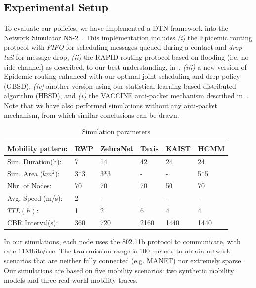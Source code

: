 \subsection{Experimental Setup}
\label{sec:ExperimentalSetup}

To evaluate our policies, we have implemented a DTN framework into the Network Simulator NS-2~\cite{DTN-NS2}. This implementation includes \emph{(i)} the Epidemic routing protocol with \emph{FIFO} for scheduling messages queued during a contact and \emph{drop-tail} for message drop, \emph{(ii)} the RAPID routing protocol based on flooding (i.e. no side-channel) as described, to our best
understanding, in~\cite{Levine:Sigcomm07}, \emph{(iii)} a new version of Epidemic routing enhanced with our optimal joint scheduling and drop policy (GBSD), \emph{(iv)} another version using our statistical learning based distributed algorithm (HBSD), and \emph{(v)} the VACCINE anti-packet mechanism described in~\cite{Towsley:Epidemic}. Note that we have also performed simulations without any anti-packet mechanism, from which similar conclusions can be drawn.

\begin{table}[!h]
\renewcommand{\arraystretch}{1.1}
\caption{Simulation parameters}
\centering
\begin{tabular}{|p{4cm}|p{1.5cm}|p{1.5cm}|p{1.5cm}|p{1.5cm}|p{1.5cm}|}
\hline
\bfseries Mobility pattern: & RWP & ZebraNet & Taxis & KAIST& HCMM \\
\hline
Sim. Duration(h):& 7 & 14 & 42 & 24 & 24\\
\hline
Sim. Area ($km^2$):& 3*3 & 3*3 & - & - & 5*5\\
\hline
Nbr. of Nodes: & 70 & 70 & 70 & 50 & 70\\
\hline
Avg. Speed (m/s):& 2 & - & - & - & -\\
\hline
$TTL(h)$:& 1 & 2 & 6 & 4 & 4\\
\hline
CBR Interval(s):& 360 & 720 & 2160 & 1440& 1440\\
\hline
\end{tabular}
\label{SP}
\end{table}

In our simulations, each node uses the 802.11b protocol to communicate, with rate 11Mbits/sec. The transmission range is 100 meters, to obtain network scenarios that are neither fully connected (e.g. MANET) nor extremely sparse. Our simulations are based on five mobility scenarios: two synthetic mobility models and three real-world mobility traces.

